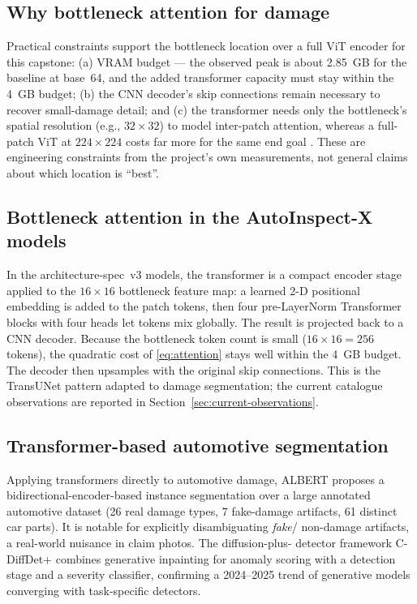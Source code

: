 \documentclass[conference]{IEEEtran}
\begin{document}
\subsection{Why bottleneck attention for damage}
Practical constraints support the bottleneck location over a full ViT encoder for
this capstone: (a) VRAM budget --- the observed peak is about 2.85~GB for the
baseline at base~64, and the added transformer capacity must stay within the
4~GB budget; (b) the CNN decoder's skip connections remain necessary to recover
small-damage detail; and (c) the transformer needs only the bottleneck's spatial
resolution (e.g., $32\times32$) to model inter-patch attention, whereas a
full-patch ViT at $224\times224$ costs far more for the same end goal
\cite{vit2021}. These are engineering constraints from the project's own
measurements, not general claims about which location is ``best''.

\subsection{Bottleneck attention in the AutoInspect-X models}
In the architecture-spec~v3 models, the transformer is a compact encoder stage
applied to the $16\times16$ bottleneck feature map: a learned 2-D positional
embedding is added to the patch tokens, then four pre-LayerNorm Transformer
blocks with four heads let tokens mix globally. The result is projected back to
a CNN decoder. Because the bottleneck token count is small ($16\times16 = 256$
tokens), the quadratic cost of \eqref{eq:attention} stays well within the 4~GB
budget. The decoder then upsamples with the original skip connections. This is
the TransUNet pattern \cite{transunet2021} adapted to damage segmentation; the
current catalogue observations are reported in Section~\ref{sec:current-observations}.

\subsection{Transformer-based automotive segmentation}
Applying transformers directly to automotive damage, ALBERT \cite{albert2025}
proposes a bidirectional-encoder-based instance segmentation over a large
annotated automotive dataset (26 real damage types, 7 fake-damage artifacts, 61
distinct car parts). It is notable for explicitly disambiguating \emph{fake}/
non-damage artifacts, a real-world nuisance in claim photos. The diffusion-plus-
detector framework C-DiffDet+ \cite{cdiffdet2025} combines generative inpainting
for anomaly scoring with a detection stage and a severity classifier, confirming
a 2024--2025 trend of generative models converging with task-specific detectors.
\end{document}
